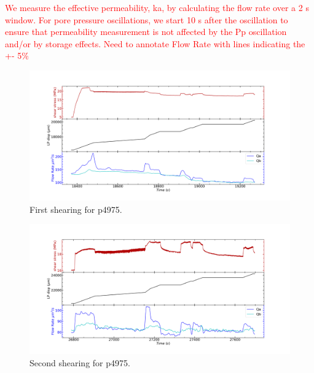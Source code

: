 \documentclass[letterpaper,10pt]{article}
\begin{document}
	\textcolor{red}{We measure the effective permeability, ka, by calculating the flow rate over a 2 s window. For pore pressure oscillations, we start 10 s after the oscillation to ensure that permeability measurement is not affected by the Pp oscillation and/or by storage effects. Need to annotate Flow Rate with lines indicating the +- 5\%}
	
	\newpage
	
	
	
	\newpage
	
	\begin{figure}[ht]
		\centering
		\includegraphics[width=1\columnwidth]{Shearing_p4975_shr1}
		\caption{First shearing for p4975.}
		\label{fig:shr1_p4975}
	\end{figure}
	
	\newpage
	
	\begin{figure}[ht]
		\centering
		\includegraphics[width=1\columnwidth]{Shearing_p4975_shr2}
		\caption{Second shearing for p4975.}
		\label{fig:shr2_p4975}
	\end{figure}
	
\end{document}
